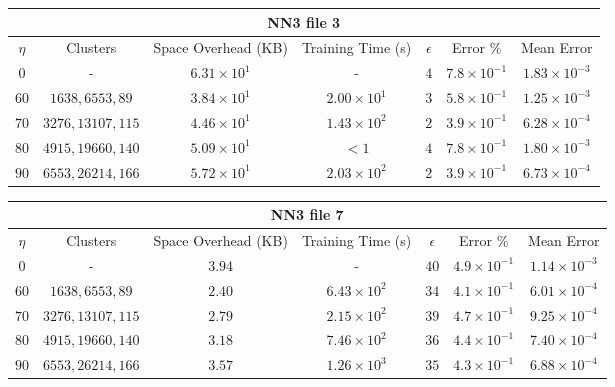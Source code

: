 \par\null\par
\par\null\par

\pagebreak

\begin{adjustwidth}{-1.5cm}{}
\begin{tabular}{ccccccc}
\hline
\multicolumn{7}{c}{NN3 file 3} \\
\toprule
$\eta$ & Clusters & Space Overhead (KB) & Training Time (s) & $\epsilon$ & Error \% & Mean Error\\
\midrule
$0$ & - & $6.31 \times 10^1$ & - & $4$ & $7.8 \times 10^{-1}$ & $1.83 \times 10^{-3}$\\
$60$ & $1638, 6553, 89$ & $3.84 \times 10^1$ & $2.00 \times 10^1$ & $3$ & $5.8 \times 10^{-1}$ & $1.25 \times 10^{-3}$\\
$70$ & $3276, 13107, 115$ & $4.46 \times 10^1$ & $1.43 \times 10^2$ & $2$ & $3.9 \times 10^{-1}$ & $6.28 \times 10^{-4}$\\
$80$ & $4915, 19660, 140$ & $5.09 \times 10^1$ & $<1$ & $4$ & $7.8 \times 10^{-1}$ & $1.80 \times 10^{-3}$\\
$90$ & $6553, 26214, 166$ & $5.72 \times 10^1$ & $2.03 \times 10^2$ & $2$ & $3.9 \times 10^{-1}$ & $6.73 \times 10^{-4}$\\
\bottomrule
\end{tabular}
\end{adjustwidth}

\par\null\par
\par\null\par

\begin{adjustwidth}{-1.5cm}{}
\begin{tabular}{ccccccc}
\hline
\multicolumn{7}{c}{NN3 file 7} \\
\toprule
$\eta$ & Clusters & Space Overhead (KB) & Training Time (s) & $\epsilon$ & Error \% & Mean Error\\
\midrule
$0$  & - & $3.94$ & - & $40$ & $4.9 \times 10^{-1}$ & $1.14 \times 10^{-3}$\\
$60$ & $1638, 6553, 89$ & $2.40$ & $6.43 \times 10^2$ & $34$ & $4.1 \times 10^{-1}$ & $6.01 \times 10^{-4}$\\
$70$ & $3276, 13107, 115$ & $2.79$ & $2.15 \times 10^2$ & $39$ & $4.7 \times 10^{-1}$ & $9.25 \times 10^{-4}$\\
$80$ & $4915, 19660, 140$ & $3.18$ & $7.46 \times 10^2$ & $36$ & $4.4 \times 10^{-1}$ & $7.40 \times 10^{-4}$\\
$90$ & $6553, 26214, 166$ & $3.57$ & $1.26 \times 10^3$ & $35$ & $4.3 \times 10^{-1}$ & $6.88 \times 10^{-4}$\\
\bottomrule
\end{tabular}
\end{adjustwidth}


